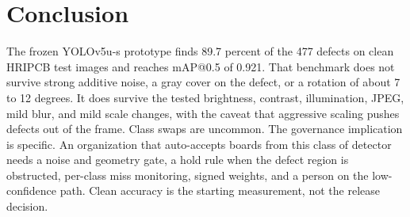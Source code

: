 \documentclass[conference]{IEEEtran}
\begin{document}
\section{Conclusion}
The frozen YOLOv5u-s prototype finds 89.7 percent of the 477 defects on clean HRIPCB test images and reaches mAP@0.5 of 0.921. That benchmark does not survive strong additive noise, a gray cover on the defect, or a rotation of about 7 to 12 degrees. It does survive the tested brightness, contrast, illumination, JPEG, mild blur, and mild scale changes, with the caveat that aggressive scaling pushes defects out of the frame. Class swaps are uncommon. The governance implication is specific. An organization that auto-accepts boards from this class of detector needs a noise and geometry gate, a hold rule when the defect region is obstructed, per-class miss monitoring, signed weights, and a person on the low-confidence path. Clean accuracy is the starting measurement, not the release decision.

\FloatBarrier


\end{document}
